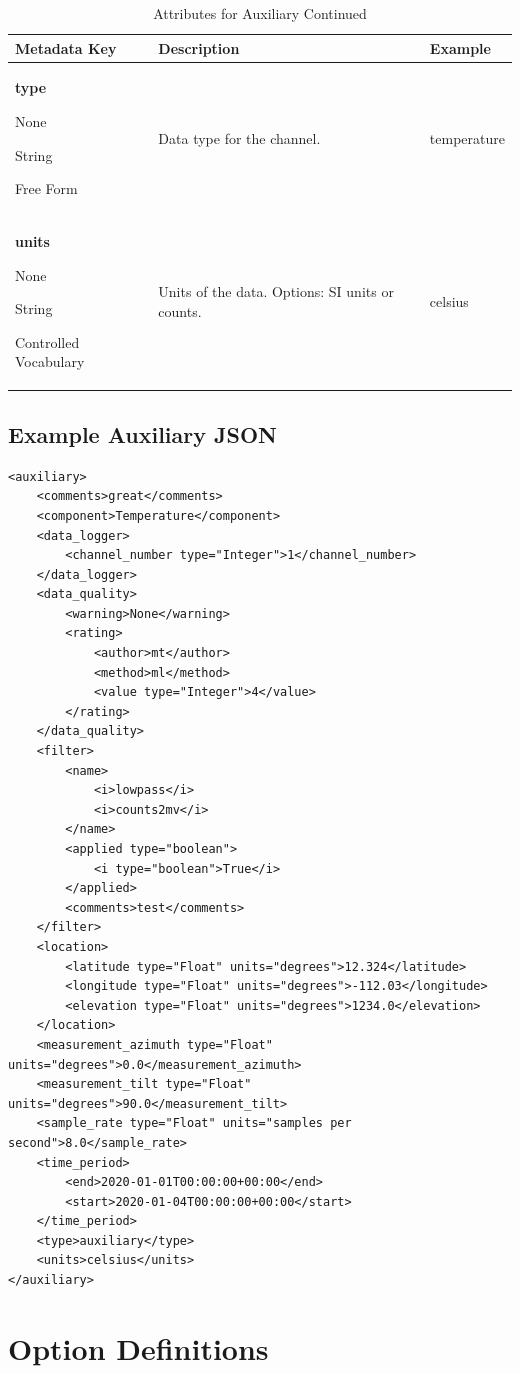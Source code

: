 \documentclass[12pt]{article}
\newcommand{\True}[0]{{\color{Red}{\textbf{True}}}}
\newcommand{\entry}[7]{
	\textbf{#1} 
	\begin{itemize}[topsep=5pt,itemsep=-.1pt,parsep=-2pt,partopsep=0pt,labelwidth=2em,align=left,itemindent=1em]
		\begin{small}
			\item[Required:] #2
			\item[Units:] #3
			\item[Type:] #4
			\item[Style:] #5
		\end{small}
	\end{itemize} & #6 & #7 \\ \midrule}
\begin{document}
\clearpage
\newpage
\begin{table}[h!]
	\caption*{Attributes for Auxiliary  Continued}
	\begin{tabular}{p{}>{\raggedright}p{}>{\raggedright\arraybackslash}p{}}
		\textbf{Metadata Key} & \textbf{Description} & \textbf{Example} \\ \toprule
		\entry{type}{\True}{None}{String}{Free Form}{Data type for the channel.}{temperature}
		\entry{units}{\True}{None}{String}{Controlled Vocabulary}{Units of the data.  Options: SI units or counts.}{celsius}
	\end{tabular}
\end{table}


\newpage
\subsection{Example Auxiliary JSON} 

\begin{verbatim}
<auxiliary>
    <comments>great</comments>
    <component>Temperature</component>
    <data_logger>
        <channel_number type="Integer">1</channel_number>
    </data_logger>
    <data_quality>
        <warning>None</warning>
        <rating>
            <author>mt</author>
            <method>ml</method>
            <value type="Integer">4</value>
        </rating>
    </data_quality>
    <filter>
        <name>
            <i>lowpass</i>
            <i>counts2mv</i>
        </name>
        <applied type="boolean">
            <i type="boolean">True</i>
        </applied>
        <comments>test</comments>
    </filter>
    <location>
        <latitude type="Float" units="degrees">12.324</latitude>
        <longitude type="Float" units="degrees">-112.03</longitude>
        <elevation type="Float" units="degrees">1234.0</elevation>
    </location>
    <measurement_azimuth type="Float" units="degrees">0.0</measurement_azimuth>
    <measurement_tilt type="Float" units="degrees">90.0</measurement_tilt>
    <sample_rate type="Float" units="samples per second">8.0</sample_rate>
    <time_period>
        <end>2020-01-01T00:00:00+00:00</end>
        <start>2020-01-04T00:00:00+00:00</start>
    </time_period>
    <type>auxiliary</type>
    <units>celsius</units>
</auxiliary>
\end{verbatim}

\newpage
\appendix
\section{Option Definitions}
\label{appendix}
\end{document}
